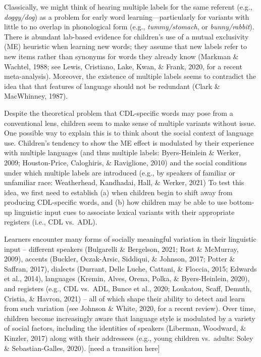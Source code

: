 \documentclass[10pt, letterpaper]{article}
\begin{document}
Classically, we might think of hearing multiple labels for the same
referent (e.g., \emph{doggy/dog}) as a problem for early word
learning---particularly for variants with little to no overlap in
phonological form (e.g., \emph{tummy/stomach}, or \emph{bunny/rabbit}).
There is abundant lab-based evidence for children's use of a mutual
exclusivity (ME) heuristic when learning new words; they assume that new
labels refer to new items rather than synonyms for words they already
know (Markman \& Wachtel, 1988; see Lewis, Cristiano, Lake, Kwan, \&
Frank, 2020, for a recent meta-analysis). Moreover, the existence of
multiple labels seems to contradict the idea that that features of
language should not be redundant (Clark \& MacWhinney, 1987).

Despite the theoretical problem that CDL-specific words may pose from a
conventional lens, children seem to make sense of multiple variants
without issue. One possible way to explain this is to think about the
social context of language use. Children's tendency to show the ME
effect is modulated by their experience with multiple languages (and
thus multiple labels: Byers-Heinlein \& Werker, 2009; Houston-Price,
Caloghiris, \& Raviglione, 2010) and the social conditions under which
multiple labels are introduced (e.g., by speakers of familiar or
unfamiliar race: Weatherhead, Kandhadai, Hall, \& Werker, 2021) To test
this idea, we first need to establish (a) when children begin to shift
away from producing CDL-specific words, and (b) how children may be able
to use bottom-up linguistic input cues to associate lexical variants
with their appropriate registers (i.e., CDL vs.~ADL).

Learners encounter many forms of socially meaningful variation in their
linguistic input -- different speakers (Bulgarelli \& Bergelson, 2021;
Rost \& McMurray, 2009), accents (Buckler, Oczak-Arsic, Siddiqui, \&
Johnson, 2017; Potter \& Saffran, 2017), dialects (Durrant, Delle Luche,
Cattani, \& Floccia, 2015; Edwards et al., 2014), languages (Kremin,
Alves, Orena, Polka, \& Byers-Heinlein, 2020), and registers (e.g., CDL
vs.~ADL, Bunce et al., 2020; Loukatou, Scaff, Demuth, Cristia, \&
Havron, 2021) -- all of which shape their ability to detect and learn
from such variation (see Johnson \& White, 2020, for a recent review).
Over time, children become increasingly aware that language style is
modulated by a variety of social factors, including the identities of
speakers (Liberman, Woodward, \& Kinzler, 2017) along with their
addressees (e.g., young children vs.~adults: Soley \& Sebastian-Galles,
2020). {[}need a transition here{]}
\end{document}
